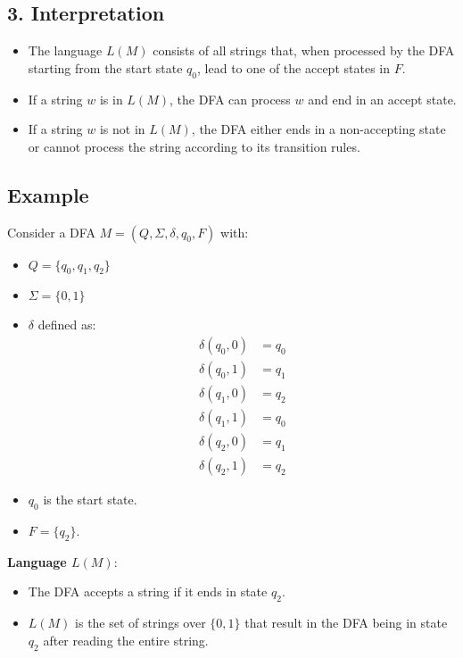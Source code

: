 \documentclass[12pt]{article}
\begin{document}
\subsection*{3. Interpretation}
\begin{itemize}
    \item The language \( L(M) \) consists of all strings that, when processed by the DFA starting from the start state \( q_0 \), lead to one of the accept states in \( F \).
    \item If a string \( w \) is in \( L(M) \), the DFA can process \( w \) and end in an accept state.
    \item If a string \( w \) is not in \( L(M) \), the DFA either ends in a non-accepting state or cannot process the string according to its transition rules.
\end{itemize}

\subsection*{Example}

Consider a DFA \( M = (Q, \Sigma, \delta, q_0, F) \) with:

\begin{itemize}
    \item \( Q = \{q_0, q_1, q_2\} \)
    \item \( \Sigma = \{0, 1\} \)
    \item \( \delta \) defined as:
    \begin{align*}
    \delta(q_0, 0) &= q_0 \\
    \delta(q_0, 1) &= q_1 \\
    \delta(q_1, 0) &= q_2 \\
    \delta(q_1, 1) &= q_0 \\
    \delta(q_2, 0) &= q_1 \\
    \delta(q_2, 1) &= q_2
    \end{align*}
    \item \( q_0 \) is the start state.
    \item \( F = \{q_2\} \).
\end{itemize}

\textbf{Language \( L(M) \)}:
\begin{itemize}
    \item The DFA accepts a string if it ends in state \( q_2 \).
    \item \( L(M) \) is the set of strings over \( \{0, 1\} \) that result in the DFA being in state \( q_2 \) after reading the entire string.
\end{itemize}
\end{document}
